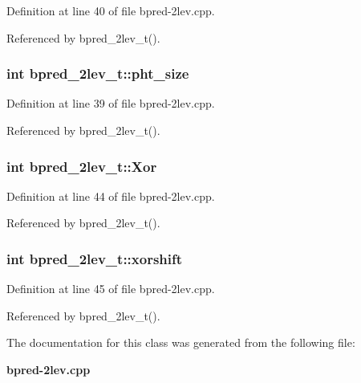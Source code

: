 Definition at line 40 of file bpred-2lev.cpp.

Referenced by bpred\_\-2lev\_\-t().
\subsubsection[{pht\_\-size}]{\setlength{\rightskip}{0pt plus 5cm}int {\bf bpred\_\-2lev\_\-t::pht\_\-size}\hspace{0.3cm}{\tt  [protected]}}\label{classbpred__2lev__t_6d316d55008054b325267aab912bc33a}




Definition at line 39 of file bpred-2lev.cpp.

Referenced by bpred\_\-2lev\_\-t().
\subsubsection[{Xor}]{\setlength{\rightskip}{0pt plus 5cm}int {\bf bpred\_\-2lev\_\-t::Xor}\hspace{0.3cm}{\tt  [protected]}}\label{classbpred__2lev__t_7f576dad58b57977a5d86054eed0e3c3}




Definition at line 44 of file bpred-2lev.cpp.

Referenced by bpred\_\-2lev\_\-t().
\subsubsection[{xorshift}]{\setlength{\rightskip}{0pt plus 5cm}int {\bf bpred\_\-2lev\_\-t::xorshift}\hspace{0.3cm}{\tt  [protected]}}\label{classbpred__2lev__t_7b378f2111da26aa62fe431a18f8a22f}




Definition at line 45 of file bpred-2lev.cpp.

Referenced by bpred\_\-2lev\_\-t().

The documentation for this class was generated from the following file:\begin{CompactItemize}
\item 
{\bf bpred-2lev.cpp}\end{CompactItemize}
